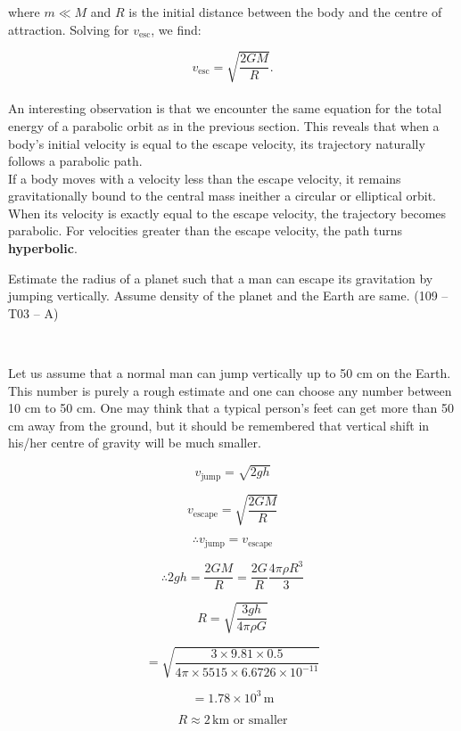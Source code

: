 \documentclass{article}
\begin{document}
where $m \ll M$ and $R$ is the initial distance between the body and the centre of attraction. Solving for $v_{\text{esc}}$, we find:

\[
\boxed{v_{\text{esc}} = \sqrt{\frac{2GM}{R}}}.
\]
\\

An interesting observation is that we encounter the same equation for the total energy of a parabolic orbit as in the previous section. This reveals that when a body’s initial velocity is equal to the escape velocity, its trajectory naturally follows a parabolic path. 
\\
If a body moves with a velocity less than the escape velocity, it remains gravitationally bound to the central mass ineither a circular or elliptical orbit. When its velocity is exactly equal to the escape velocity, the trajectory becomes parabolic. For velocities greater than the escape velocity, the path turns \textbf{hyperbolic}.
\\
\begin{tcolorbox}[colback=green!5!white, colframe=green!75!black, title={Problem}]
Estimate the radius of a planet such that a man can escape its gravitation by jumping vertically. 
Assume density of the planet and the Earth are same. \hfill (109 -- T03 -- A)
\end{tcolorbox}
\\
\begin{tcolorbox}[colback=green!5!white, colframe=green!75!black, title={Solution}]
Let us assume that a normal man can jump vertically up to 50 cm on the Earth. This number is purely a rough estimate and one can choose any number between 10 cm to 50 cm. One may think that a typical person’s feet can get more than 50 cm away from the ground, but it should be remembered that vertical shift in his/her centre of gravity will be much smaller.  

\[
v_{\text{jump}} = \sqrt{2gh}
\]

\[
v_{\text{escape}} = \sqrt{\frac{2GM}{R}}
\]

\[
\therefore v_{\text{jump}} = v_{\text{escape}}
\]

\[
\therefore 2gh = \frac{2GM}{R} = \frac{2G}{R}\frac{4\pi \rho R^3}{3}
\]

\[
R = \sqrt{\frac{3gh}{4\pi \rho G}}
\]

\[
= \sqrt{\frac{3 \times 9.81 \times 0.5}{4 \pi \times 5515 \times 6.6726 \times 10^{-11}}}
\]

\[
= 1.78 \times 10^3 \, \text{m}
\]

\[
R \approx 2 \, \text{km or smaller}
\]
\end{tcolorbox}
\end{document}
